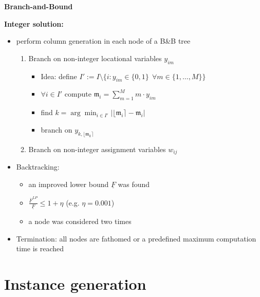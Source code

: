 \documentclass[xcolor=dvipsnames,aspectratio=169, handout, mathserif]{beamer}
\begin{document}
\begin{frame}{\textbf{Branch-and-Bound}}

\textbf{Integer solution:}
\begin{itemize}
    \item perform column generation in each node of a B\&B tree
        \begin{enumerate}
            \item Branch on non-integer locational variables $y_{im}$
                \begin{itemize}
                    \item Idea: define $I':= I \setminus \{i: y_{im} \in \{0,1\} \ \ \forall m \in \{1,\dots,M\}\}$
                    \item $\forall i \in I'$ compute $ \mathfrak{m}_i = \sum_{m =1}^M m \cdot y_{im}$ 
                    \item find $k = \arg \min_{i\in I'}|\lfloor \mathfrak{m}_i \rceil- \mathfrak{m}_i|$ 
                    \item branch on $y_{k,\lfloor \mathfrak{m}_{k} \rceil}$
                \end{itemize}
            \item Branch on non-integer assignment variables $w_{ij}$
        \end{enumerate}
    \item Backtracking:
        \begin{itemize}
            \item an improved lower bound $\underline{F}$ was found
            \item $\frac{\overline{F}^{LP}}{\underline{F}} \leq 1 + \eta$ (e.g. $\eta = 0.001$)
            \item a node was considered two times
        \end{itemize}
    \item Termination: all nodes are fathomed or a predefined maximum computation time is reached
\end{itemize}
    
\end{frame}

\section{Instance generation}
\end{document}
